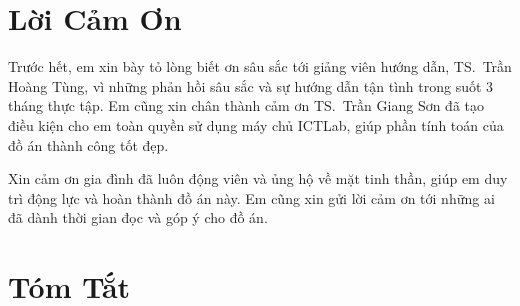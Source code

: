 \documentclass[12pt,a4paper]{report}
\begin{document}

\chapter*{Lời Cảm Ơn}

Trước hết, em xin bày tỏ lòng biết ơn sâu sắc tới giảng viên hướng dẫn,
TS.\ Trần Hoàng Tùng, vì những phản hồi sâu sắc và sự hướng dẫn tận tình trong
suốt 3 tháng thực tập. Em cũng xin chân thành cảm ơn TS.\ Trần Giang Sơn đã tạo
điều kiện cho em toàn quyền sử dụng máy chủ ICTLab, giúp phần tính toán của đồ
án thành công tốt đẹp.

Xin cảm ơn gia đình đã luôn động viên và ủng hộ về mặt tinh thần, giúp em duy
trì động lực và hoàn thành đồ án này. Em cũng xin gửi lời cảm ơn tới những ai đã
dành thời gian đọc và góp ý cho đồ án.

\chapter*{Tóm Tắt}
\end{document}
